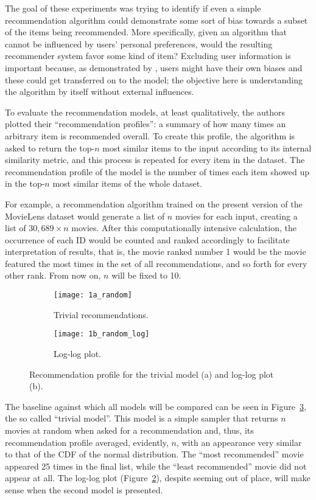 The goal of these experiments was trying to identify if even a simple
recommendation algorithm could demonstrate some sort of bias towards a subset of
the items being recommended. More specifically, given an algorithm that cannot
be influenced by users' personal preferences, would the resulting recommender
system favor some kind of item? Excluding user information is important because,
as demonstrated by \citet{stoica_algorithmic_2018}, users might have their own
biases and these could get transferred on to the model; the objective here is
understanding the algorithm by itself without external influences.

To evaluate the recommendation models, at least qualitatively, the authors
plotted their ``recommendation profiles'': a summary of how many times an
arbitrary item is recommended overall. To create this profile, the algorithm is
asked to return the top-$n$ most similar items to the input according to its
internal similarity metric, and this process is repeated for every item in the
dataset. The recommendation profile of the model is the number of times each
item showed up in the top-$n$ most similar items of the whole dataset.

For example, a recommendation algorithm trained on the present version of the
MovieLens dataset would generate a list of $n$ movies for each input, creating a
list of $30,689 \times n$ movies. After this computationally intensive
calculation, the occurrence of each ID would be counted and ranked accordingly
to facilitate interpretation of results, that is, the movie ranked number 1
would be the movie featured the most times in the set of all recommendations,
and so forth for every other rank. From now on, $n$ will be fixed to 10.

\begin{figure}
  \centering
  \begin{subfigure}{0.45\textwidth}
    \centering
    \texttt{[image: 1a\_random]}
    \caption{Trivial recommendations.\label{fig:fig1a}}
  \end{subfigure}
  \begin{subfigure}{0.45\textwidth}
    \centering
    \texttt{[image: 1b\_random\_log]}
    \caption{Log-log plot.\label{fig:fig1b}}
  \end{subfigure}
  \caption{Recommendation profile for the trivial model (a) and log-log plot
    (b).\label{fig:fig1}}
\end{figure}

The baseline against which all models will be compared can be seen in
Figure~\ref{fig:fig1}, the so called ``trivial model''. This model is a simple
sampler that returns $n$ movies at random when asked for a recommendation and,
thus, its recommendation profile averaged, evidently, $n$, with an appearance
very similar to that of the CDF of the normal distribution. The ``most
recommended'' movie appeared 25 times in the final list, while the ``least
recommended'' movie did not appear at all. The log-log plot
(Figure~\ref{fig:fig1b}), despite seeming out of place, will make sense when the
second model is presented.


